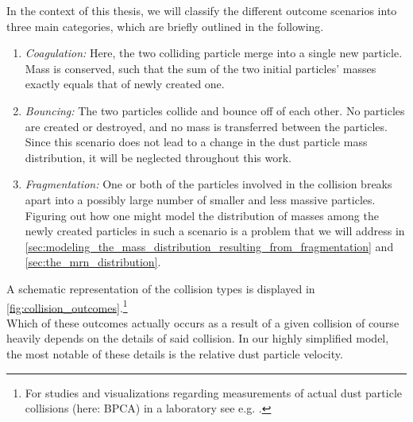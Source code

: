         In the context of this thesis, we will classify the different outcome scenarios into 
        three main categories, which are briefly outlined in the following. 
        \begin{enumerate}
            \item \textit{Coagulation:} Here, the two colliding particle merge into a single 
                  new particle. Mass is conserved, such that the sum of the two initial particles'
                  masses exactly equals that of newly created one.
            \item \textit{Bouncing:} The two particles collide and bounce off of each other.
                  No particles are created or destroyed, and no mass is transferred between the 
                  particles. Since this scenario does not lead to a change in the dust particle 
                  mass distribution, it will be neglected throughout this work.
            \item \textit{Fragmentation:} One or both of the particles involved in the collision 
                  breaks apart into a possibly large number of smaller and less massive particles.
                  Figuring out how one might model the distribution of masses among the newly 
                  created particles in such a scenario is a problem that we will address in 
                  \cref{sec:modeling_the_mass_distribution_resulting_from_fragmentation} and
                  \cref{sec:the_mrn_distribution}.

        \end{enumerate}

        A schematic representation of the collision types is displayed in
        \cref{fig:collision_outcomes}.\footnote{
            For studies and visualizations regarding measurements of actual dust particle 
            collisions (here: BPCA) in a laboratory see e.g. \cite{wada_2009}.
        } \\

        Which of these outcomes actually occurs as a result of a given collision of course heavily 
        depends on the details of said collision. 
        In our highly simplified model, the most notable of these details is the 
        relative dust particle velocity. \\

